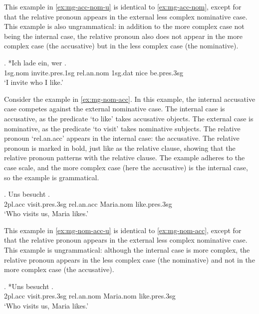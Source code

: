 This example in \ref{ex:mg-acc-nom-u} is identical to \ref{ex:mg-acc-nom}, except for that the relative pronoun appears in the external less complex nominative case. This example is also ungrammatical: in addition to the more complex case not being the internal case, the relative pronoun also does not appear in the more complex case (the accusative) but in the less complex case (the nominative).

\exg. *Ich {lade ein}, wer   .\\
 1\ac{sg}.\ac{nom} invite.\ac{pres}.1\ac{sg}\scsub{[acc]} \ac{rel}.\ac{an}.\ac{nom} 1\ac{sg}.\ac{dat} nice be.\ac{pres}.3\ac{sg}\scsub{[nom]}\\
 `I invite who I like.' \label{ex:mg-acc-nom-u}

Consider the example in \ref{ex:mg-nom-acc}. In this example, the internal accusative case competes against the external nominative case.
The internal case is accusative, as the predicate  `to like' takes accusative objects.
The external case is nominative, as the predicate  `to visit' takes nominative subjects.
The relative pronoun  `\ac{rel}.\ac{an}.\ac{acc}' appears in the internal case: the accusative. The relative pronoun is marked in bold, just like as the relative clause, showing that the relative pronoun patterns with the relative clause.
The example adheres to the case scale, and the more complex case (here the accusative) is the internal case, so the example is grammatical.

\exg. Uns besucht   .\\
 2\ac{pl}.\ac{acc} visit.\ac{pres}.3\ac{sg}\scsub{[nom]} \ac{rel}.\ac{an}.\ac{acc} Maria.\ac{nom} like.\ac{pres}.3\ac{sg}\scsub{[acc]}\\
 `Who visits us, Maria likes.' \label{ex:mg-nom-acc}

This example in \ref{ex:mg-nom-acc-u} is identical to \ref{ex:mg-nom-acc}, except for that the relative pronoun appears in the external less complex nominative case. This example is ungrammatical: although the internal case is more complex, the relative pronoun appears in the less complex case (the nominative) and not in the more complex case (the accusative).

\exg. *Uns besucht   .\\
 2\ac{pl}.\ac{acc} visit.\ac{pres}.3\ac{sg}\scsub{[nom]} \ac{rel}.\ac{an}.\ac{nom} Maria.\ac{nom} like.\ac{pres}.3\ac{sg}\scsub{[acc]}\\
 `Who visits us, Maria likes.' \label{ex:mg-nom-acc-u}

